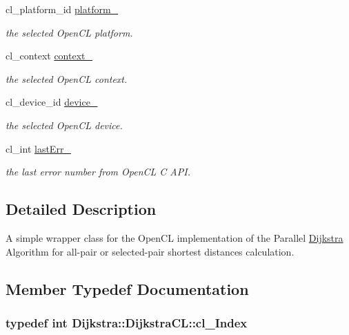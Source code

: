 \begin{DoxyCompactItemize}
cl\+\_\+platform\+\_\+id \hyperlink{class_dijkstra_1_1_dijkstra_c_l_a48fb6896749198f8ecca726b887bac86}{platform\+\_\+}
\begin{DoxyCompactList}\small\item\em the selected Open\+C\+L platform. \end{DoxyCompactList}\item 
cl\+\_\+context \hyperlink{class_dijkstra_1_1_dijkstra_c_l_a53f966d6cc79d454cbc48e11467662b4}{context\+\_\+}
\begin{DoxyCompactList}\small\item\em the selected Open\+C\+L context. \end{DoxyCompactList}\item 
cl\+\_\+device\+\_\+id \hyperlink{class_dijkstra_1_1_dijkstra_c_l_ac848f9681e88c61e339ab6d70bcfacdf}{device\+\_\+}
\begin{DoxyCompactList}\small\item\em the selected Open\+C\+L device. \end{DoxyCompactList}\item 
cl\+\_\+int \hyperlink{class_dijkstra_1_1_dijkstra_c_l_aa4eec2b97cdd4a59fd814035736f0137}{last\+Err\+\_\+}
\begin{DoxyCompactList}\small\item\em the last error number from Open\+C\+L C A\+P\+I. \end{DoxyCompactList}\end{DoxyCompactItemize}


\subsection{Detailed Description}
A simple wrapper class for the Open\+C\+L implementation of the Parallel \hyperlink{namespace_dijkstra}{Dijkstra} Algorithm for all-\/pair or selected-\/pair shortest distances calculation. 

\subsection{Member Typedef Documentation}
\hypertarget{class_dijkstra_1_1_dijkstra_c_l_aab92585b062690f0835f154dc28f8c04}{
\subsubsection[{cl\+\_\+\+Index}]{\setlength{\rightskip}{0pt plus 5cm}typedef int {\bf Dijkstra\+::\+Dijkstra\+C\+L\+::cl\+\_\+\+Index}}}\label{class_dijkstra_1_1_dijkstra_c_l_aab92585b062690f0835f154dc28f8c04}


